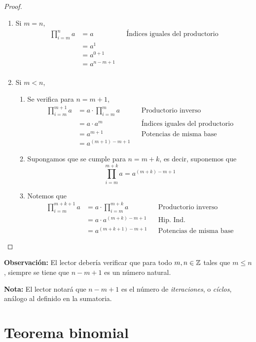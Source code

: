 \begin{proof}\leavevmode
  \begin{enumerate}[label=\Roman*)]
    \item Si $m=n$, 
    \begin{align*}
      \prod_{i=m}^{n} a &= a && \text{Índices iguales del productorio}\\
      &= a^1\\
      &= a^{0+1}\\
      &= a^{n-m+1}\\
    \end{align*}
    \item Si $m<n$,
    \begin{enumerate}[label=\roman*)]
      \item Se verifica para $n=m+1$,
      \begin{align*}
        \prod_{i=m}^{m+1} a &= a\cdot \prod_{i=m}^{m} a && \text{Productorio inverso}\\
        &= a \cdot a^m && \text{Índices iguales del productorio}\\
        &= a^{m+1} && \text{Potencias de misma base}\\
        &= a^{(m+1)-m+1}
      \end{align*}
      \item Supongamos que se cumple para $n=m+k$, es decir, suponemos que \[\prod_{i=m}^{m+k} a = a^{(m+k)-m+1}\]
      \item Notemos que
      \begin{align*}
        \prod_{i=m}^{m+k+1} a &= a\cdot \prod_{i=m}^{m+k} a && \text{Productorio inverso}\\
        &= a\cdot a^{(m+k)-m+1} && \text{Hip. Ind.}\\
        &= a^{(m+k+1)-m+1} && \text{Potencias de misma base}
      \end{align*}
    \end{enumerate}
  \end{enumerate}
\end{proof}

\textbf{Observación:} El lector debería verificar que para todo $m,n\in \mathbb{Z}$ tales que $m\leq n$, siempre se tiene que $n-m+1$ es un número natural.

\textbf{Nota:} El lector notará que $n-m+1$ es el número de \textit{iteraciones}, o \textit{cíclos}, análogo al definido en la sumatoria.
  
\section*{Teorema binomial}

